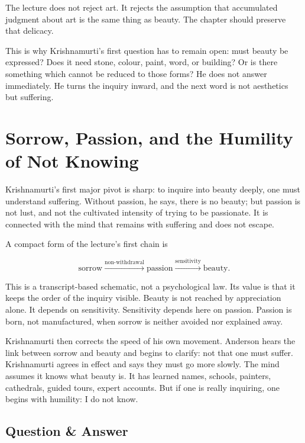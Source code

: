 \begin{remark}
The lecture does not reject art. It rejects the assumption that accumulated judgment about art is the same thing as beauty. The chapter should preserve that delicacy.
\end{remark}

This is why Krishnamurti's first question has to remain open: must beauty be expressed? Does it need stone, colour, paint, word, or building? Or is there something which cannot be reduced to those forms? He does not answer immediately. He turns the inquiry inward, and the next word is not aesthetics but suffering.

\section{Sorrow, Passion, and the Humility of Not Knowing}

Krishnamurti's first major pivot is sharp: to inquire into beauty deeply, one must understand suffering. Without passion, he says, there is no beauty; but passion is not lust, and not the cultivated intensity of trying to be passionate. It is connected with the mind that remains with suffering and does not escape.

A compact form of the lecture's first chain is

\begin{equation}
\text{sorrow}
\xrightarrow{\text{non-withdrawal}}
\text{passion}
\xrightarrow{\text{sensitivity}}
\text{beauty}.
\end{equation}

This is a transcript-based schematic, not a psychological law. Its value is that it keeps the order of the inquiry visible. Beauty is not reached by appreciation alone. It depends on sensitivity. Sensitivity depends here on passion. Passion is born, not manufactured, when sorrow is neither avoided nor explained away.

Krishnamurti then corrects the speed of his own movement. Anderson hears the link between sorrow and beauty and begins to clarify: not that one must suffer. Krishnamurti agrees in effect and says they must go more slowly. The mind assumes it knows what beauty is. It has learned names, schools, painters, cathedrals, guided tours, expert accounts. But if one is really inquiring, one begins with humility: I do not know.

\subsection{Question \& Answer}

